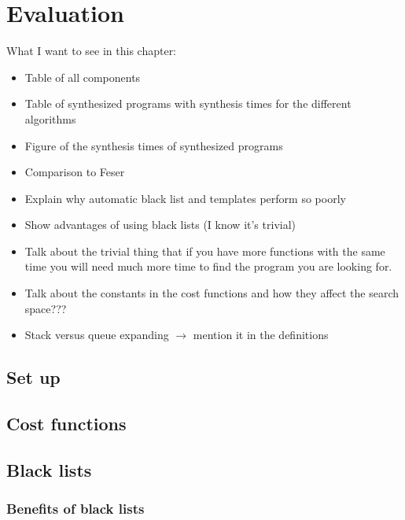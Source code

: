 \chapter{Evaluation} \label{evaluation}

What I want to see in this chapter:
\begin{itemize}
\item Table of all components
\item Table of synthesized programs with synthesis times for the different algorithms
\item Figure of the synthesis times of synthesized programs
\item Comparison to Feser
\item Explain why automatic black list and templates perform so poorly
\item Show advantages of using black lists (I know it's trivial)
\item Talk about the trivial thing that if you have more functions with the same time you will need much more time to find the program you are looking for.
\item Talk about the constants in the cost functions and how they affect the search space???
\item Stack versus queue expanding $\rightarrow$ mention it in the definitions
\end{itemize}

\section{Set up}
  
\section{Cost functions}

\section{Black lists}
  \subsection{Benefits of black lists}
